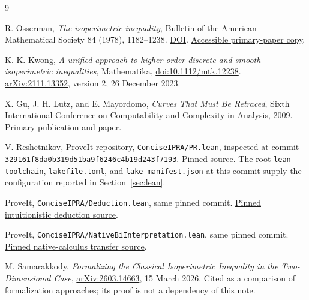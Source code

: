 \documentclass[11pt,a4paper]{article}
\theoremstyle{definition}
\begin{document}
\begin{thebibliography}{9}
\raggedright
{}
R. Osserman, \emph{The isoperimetric inequality},
Bulletin of the American Mathematical Society 84 (1978), 1182--1238.
\href{https://doi.org/10.1090/S0002-9904-1978-14553-4}{DOI}.
\href{https://metaphor.ethz.ch/x/2021/fs/401-3462-00L/sc/extras/Osserman.pdf}{Accessible primary-paper copy}.

K.-K. Kwong, \emph{A unified approach to higher order discrete and
smooth isoperimetric inequalities}, Mathematika,
\href{https://doi.org/10.1112/mtk.12238}{doi:10.1112/mtk.12238}.
\href{https://arxiv.org/abs/2111.13352}{arXiv:2111.13352}, version 2,
26 December 2023.

X. Gu, J. H. Lutz, and E. Mayordomo,
\emph{Curves That Must Be Retraced}, Sixth International Conference
on Computability and Complexity in Analysis, 2009.
\href{https://drops.dagstuhl.de/entities/document/10.4230/OASIcs.CCA.2009.2267}{Primary publication and paper}.

V. Reshetnikov, ProveIt repository,
\texttt{ConciseIPRA/PR.lean}, inspected at commit
\texttt{329161f8da0b319d51ba9f6246c4b19d243f7193}.
\href{https://github.com/VladimirReshetnikov/ProveIt/blob/329161f8da0b319d51ba9f6246c4b19d243f7193/Logic/PrimitiveRecursiveArithmetic/ConciseIPRA/Lean/ConciseIPRA/PR.lean}{Pinned source}.
The root \texttt{lean-toolchain}, \texttt{lakefile.toml}, and
\texttt{lake-manifest.json} at this commit supply the configuration
reported in Section~\ref{sec:lean}.

ProveIt, \texttt{ConciseIPRA/Deduction.lean}, same pinned commit.
\href{https://github.com/VladimirReshetnikov/ProveIt/blob/329161f8da0b319d51ba9f6246c4b19d243f7193/Logic/PrimitiveRecursiveArithmetic/ConciseIPRA/Lean/ConciseIPRA/Deduction.lean}{Pinned intuitionistic deduction source}.

ProveIt, \texttt{ConciseIPRA/NativeBiInterpretation.lean},
same pinned commit.
\href{https://github.com/VladimirReshetnikov/ProveIt/blob/329161f8da0b319d51ba9f6246c4b19d243f7193/Logic/PrimitiveRecursiveArithmetic/ConciseIPRA/Lean/ConciseIPRA/NativeBiInterpretation.lean}{Pinned native-calculus transfer source}.

M. Samarakkody, \emph{Formalizing the Classical Isoperimetric
Inequality in the Two-Dimensional Case},
\href{https://arxiv.org/abs/2603.14663}{arXiv:2603.14663},
15 March 2026. Cited as a comparison of formalization approaches;
its proof is not a dependency of this note.
\end{thebibliography}
\end{document}

